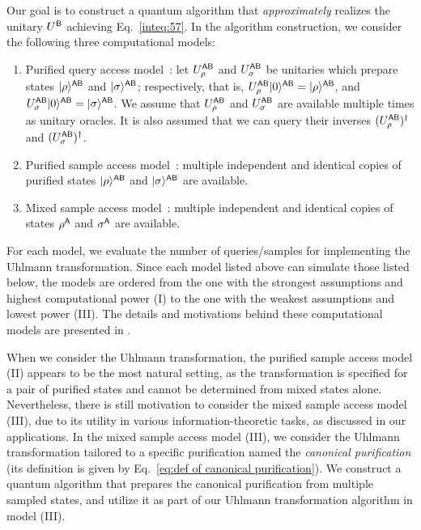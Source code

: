 Our goal is to construct a quantum algorithm that \emph{approximately} realizes the unitary $U^{\mathsf{B}}$ achieving Eq.~\eqref{inteq:57}.
In the algorithm construction, we consider the following three computational models:
\begin{enumerate}[label=\Roman*.]
    \item Purified query access model~\cite{watrous2002limitQSZK, watrous2009QSZKquantumattacks, belovs2019ClassicalDist, gilyen2019DistPropTesting, brandao2019SDPOpt, vanapeldoorn2019impleveSDP, Subramanian2021estimatealphalenni, gilyen2022improvedfidelity, Apeldoorn2023TomoPurifQuery, wang2023QAfidelityest, wang2023SampletoQuary, luo2024SuccinctTest, wang2024NewQuantEnt, Liu2024geometricmean}: let $U_\rho^{{\mathsf{A}}{\mathsf{B}}}$ and $U_\sigma^{{\mathsf{A}}{\mathsf{B}}}$ be unitaries which prepare states $|\rho\rangle^{{\mathsf{A}}{\mathsf{B}}}$ and $|\sigma\rangle^{{\mathsf{A}}{\mathsf{B}}}$; respectively, that is, $U_\rho^{{\mathsf{A}}{\mathsf{B}}}|0\rangle^{{\mathsf{A}}{\mathsf{B}}}=|\rho\rangle^{{\mathsf{A}}{\mathsf{B}}}$, and $U_\sigma^{{\mathsf{A}}{\mathsf{B}}}|0\rangle^{{\mathsf{A}}{\mathsf{B}}}=|\sigma\rangle^{{\mathsf{A}}{\mathsf{B}}}$.
    We assume that $U_\rho^{{\mathsf{A}}{\mathsf{B}}}$ and $U_\sigma^{{\mathsf{A}}{\mathsf{B}}}$ are available multiple times as unitary oracles.
    It is also assumed that we can query their inverses $(U_\rho^{{\mathsf{A}}{\mathsf{B}}})^\dag$ and $(U_\sigma^{{\mathsf{A}}{\mathsf{B}}})^\dag$.
    \item Purified sample access model~\cite{chen2024localtestUniInv, liu2024exponentialseparations}:
    multiple independent and identical copies of purified states $|\rho\rangle^{{\mathsf{A}}{\mathsf{B}}}$ and $|\sigma\rangle^{{\mathsf{A}}{\mathsf{B}}}$ are available.
    \item Mixed sample access model~\cite{gilyen2022improvedfidelity, wang2023SampletoQuary, wang2024TimeEfficientEntEstSamp, wang2024sampleoptimal}: multiple independent and identical copies of states $\rho^{\mathsf{A}}$ and $\sigma^{\mathsf{A}}$ are available.
\end{enumerate}

For each model, we evaluate the number of queries/samples for implementing the Uhlmann transformation.
Since each model listed above can simulate those listed below, the models are ordered from the one with the strongest assumptions and highest computational power (I) to the one with the weakest assumptions and lowest power (III).
The details and motivations behind these computational models are presented in .

When we consider the Uhlmann transformation, the purified sample access model (II) appears to be the most natural setting, as the transformation is specified for a pair of purified states and cannot be determined from mixed states alone.
Nevertheless, there is still motivation to consider the mixed sample access model (III), due to its utility in various information-theoretic tasks, as discussed in our applications.
In the mixed sample access model (III), we consider the Uhlmann transformation tailored to a specific purification named the \emph{canonical purification} (its definition is given by Eq.~\eqref{eq:def of canonical purification}).
We construct a quantum algorithm that prepares the canonical purification from multiple sampled states, and utilize it as part of our Uhlmann transformation algorithm in model (III).


